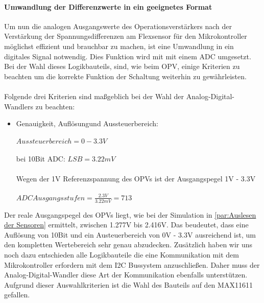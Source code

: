 \documentclass[titlepage,12pt,twoside]{article}
\begin{document}
\paragraph{Umwandlung der Differenzwerte in ein geeignetes Format}
\label{par:Umwandlung der Differenzwerte in ein geeignetes Format}
\hfill \break
\hfill \break
Um nun die analogen Ausgangswerte des Operationsverstärkers nach der Verstärkung der Spannungsdifferenzen am Flexsensor für
den Mikrokontroller möglichst effizient und brauchbar zu machen, ist eine Umwandlung in ein digitales Signal notwendig.
Dies Funktion wird mit mit einem ADC umgesetzt. Bei der Wahl dieses Logikbauteils, sind, wie beim OPV, einige Kriterien zu 
beachten um die korrekte Funktion der Schaltung weiterhin zu gewährleisten. \\
\\
Folgende drei Kriterien sind maßgeblich bei der Wahl der Analog-Digital-Wandlers zu beachten:
\begin{itemize}
	\item Genauigkeit, Auflösungund Aussteuerbereich: \\
		  \\
		  \hspace*{1cm} $ Aussteuerbereich = 0 - 3.3V $ \\
		  \\
		  \hspace*{1cm} bei 10Bit ADC: $ LSB = 3.22mV $ \\
		  \\
		  \hspace*{1cm} Wegen der 1V Referenzspannung des OPVs ist der Ausgangspegel 1V - 3.3V \\
		  \\
		  \hspace*{1cm} $ ADC Ausgangsstufen = \frac{2.3V}{3.22mV} = 713 $ \\
\end{itemize}
Der reale Ausgangspegel des OPVs liegt, wie bei der Simulation in \autoref{par:Auslesen der Sensoren} ermittelt, zwischen 1.277V bis 2.416V.
Das beudeutet, dass eine Auflösung von 10Bit und ein Austeuerbereich von 0V - 3.3V ausreichend ist, um den kompletten Wertebereich
sehr genau abzudecken. Zusätzlich haben wir uns noch dazu entschieden alle Logikbauteile die eine Kommunikation mit dem Mikrokontroller
erfordern mit dem I2C Bussystem anzuschließen. Daher muss der Analog-Digital-Wandler diese Art der Kommunikation ebenfalls unterstützen.
Aufgrund dieser Auswahlkriterien ist die Wahl des Bauteils auf den MAX11611 gefallen.\\
\\
\end{document}
